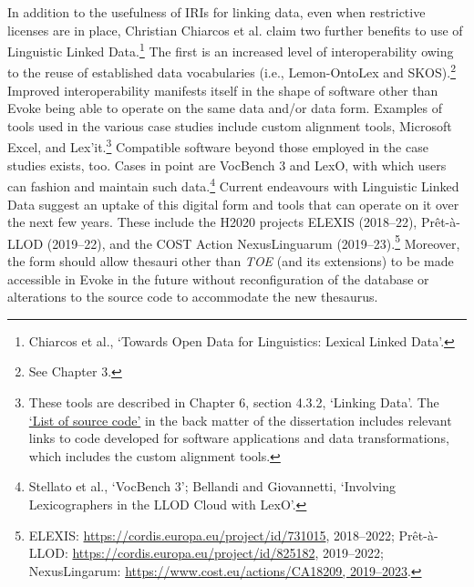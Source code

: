 In addition to the usefulness of IRIs for linking data, even when restrictive licenses are in place, Christian Chiarcos et al. claim two further benefits to use of Linguistic Linked Data.\footnote{Chiarcos et al., `Towards Open Data for Linguistics: Lexical Linked Data'.} The first is an increased level of interoperability owing to the reuse of established data vocabularies (i.e., Lemon-OntoLex and SKOS).\footnote{See Chapter 3.} Improved interoperability manifests itself in the shape of software other than Evoke being able to operate on the same data and/or data form. Examples of tools used in the various case studies include custom alignment tools, Microsoft Excel, and Lex'it.\footnote{These tools are described in Chapter 6, section 4.3.2, `Linking Data'. The \hyperref[fm:sourcecode]{`List of source code'} in the back matter of the dissertation includes relevant links to code developed for software applications and data transformations, which includes the custom alignment tools.} 
Compatible software beyond those employed in the case studies exists, too. Cases in point are VocBench 3 and LexO, with which users can fashion and maintain such data.\footnote{Stellato et al., `VocBench 3'; Bellandi and Giovannetti, `Involving Lexicographers in the LLOD Cloud with LexO'.} Current endeavours with Linguistic Linked Data suggest an uptake of this digital form and tools that can operate on it over the next few years. These include the H2020 projects ELEXIS (2018–22), Prêt-à-LLOD (2019–22), and the COST Action NexusLinguarum (2019–23).\footnote{ELEXIS: \url{https://cordis.europa.eu/project/id/731015}, 2018–2022; Prêt-à-LLOD: \url{https://cordis.europa.eu/project/id/825182}, 2019–2022; NexusLingarum: \url{https://www.cost.eu/actions/CA18209, 2019–2023}.} Moreover, the form should allow thesauri other than \textit{TOE} (and its extensions) to be made accessible in Evoke in the future without reconfiguration of the database or alterations to the source code to accommodate the new thesaurus. %

